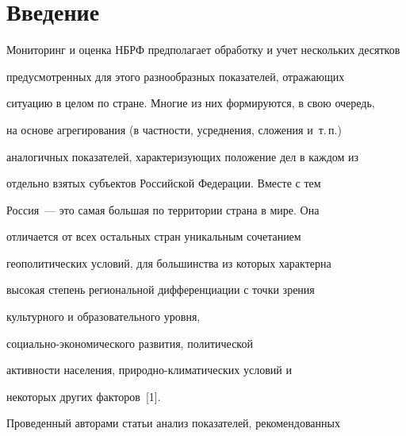 


















      \thispagestyle{headings}








\section{Введение}





    Мониторинг и оценка НБРФ предполагает обработку и учет нескольких десятков


предусмотренных для этого разнообразных показателей, отражающих


ситуацию в целом по стране. Многие из них формируются, в свою очередь,


на основе агрегирования (в частности, усреднения, сложения и~т.\,п.)\


аналогичных показателей, характеризующих положение дел в каждом из


отдельно взятых субъектов Российской Федерации. Вместе с тем


    Россия~--- это самая большая по территории страна в мире. Она


отличается от всех остальных стран уникальным сочетанием


геополитических условий, для большинства из которых характерна


высокая степень региональной дифференциации с точки зрения


культурного и образовательного уровня,


    со\-ци\-аль\-но-эко\-но\-ми\-че\-ско\-го развития, политической


активности населения, при\-род\-но-кли\-ма\-ти\-че\-ских условий и


некоторых других факторов~[1].





    Проведенный авторами статьи анализ показателей, рекомендованных


